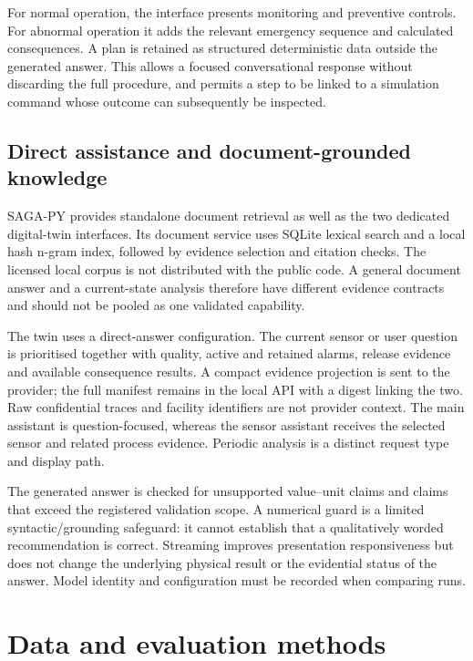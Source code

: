 \documentclass[12pt,a4paper]{article}
\begin{document}
For normal operation, the interface presents monitoring and preventive controls.
For abnormal operation it adds the relevant emergency sequence and calculated
consequences. A plan is retained as structured deterministic data outside the
generated answer. This allows a focused conversational response without
discarding the full procedure, and permits a step to be linked to a simulation
command whose outcome can subsequently be inspected.

\subsection{Direct assistance and document-grounded knowledge}
SAGA-PY provides standalone document retrieval as well as the two dedicated
digital-twin interfaces. Its document service uses SQLite lexical search and a
local hash n-gram index, followed by evidence selection and citation checks.
The licensed local corpus is not distributed with the public code. A general
document answer and a current-state analysis therefore have different evidence
contracts and should not be pooled as one validated capability.

The twin uses a direct-answer configuration. The current sensor or user
question is prioritised together with quality, active and retained alarms,
release evidence and available consequence results. A compact evidence
projection is sent to the provider; the full manifest remains in the local API
with a digest linking the two. Raw confidential traces and facility identifiers
are not provider context. The main assistant is question-focused, whereas the
sensor assistant receives the selected sensor and related process evidence.
Periodic analysis is a distinct request type and display path.

The generated answer is checked for unsupported value--unit claims and claims
that exceed the registered validation scope. A numerical guard is a limited
syntactic/grounding safeguard: it cannot establish that a qualitatively worded
recommendation is correct. Streaming improves presentation responsiveness but
does not change the underlying physical result or the evidential status of the
answer. Model identity and configuration must be recorded when comparing runs.

\section{Data and evaluation methods}
\end{document}
